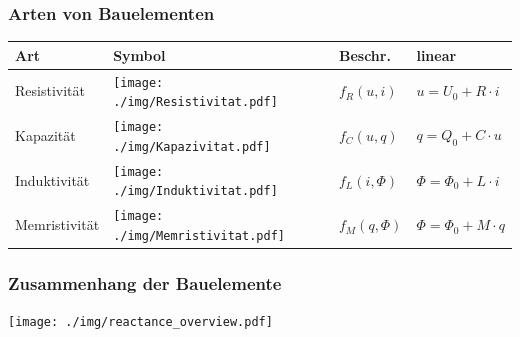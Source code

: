 \documentclass[fs, footer]{latex4ei}
\begin{document}
\begin{multicols*}{4}
    \subsubsection{Arten von Bauelementen}
    \begin{tabular}{l|l|l|l}
        Art           & Symbol                                                  & Beschr.       & linear                      \\ \hline
        Resistivität  & \texttt{[image: ./img/Resistivitat.pdf]}  & $f_R(u,i)$    & $u = U_0 + R \cdot i$       \\
        Kapazität     & \texttt{[image: ./img/Kapazivitat.pdf]}   & $f_C(u,q)$    & $q = Q_0 + C \cdot u$       \\
        Induktivität  & \texttt{[image: ./img/Induktivitat.pdf]}  & $f_L(i,\Phi)$ & $\Phi = \Phi_0 + L \cdot i$ \\
        Memristivität & \texttt{[image: ./img/Memristivitat.pdf]} & $f_M(q,\Phi)$ & $\Phi = \Phi_0 + M \cdot q$ \\
    \end{tabular}
    \subsubsection{Zusammenhang der Bauelemente}
    \begin{center}
        \texttt{[image: ./img/reactance\_overview.pdf]}
    \end{center}

\end{multicols*}
\end{document}
